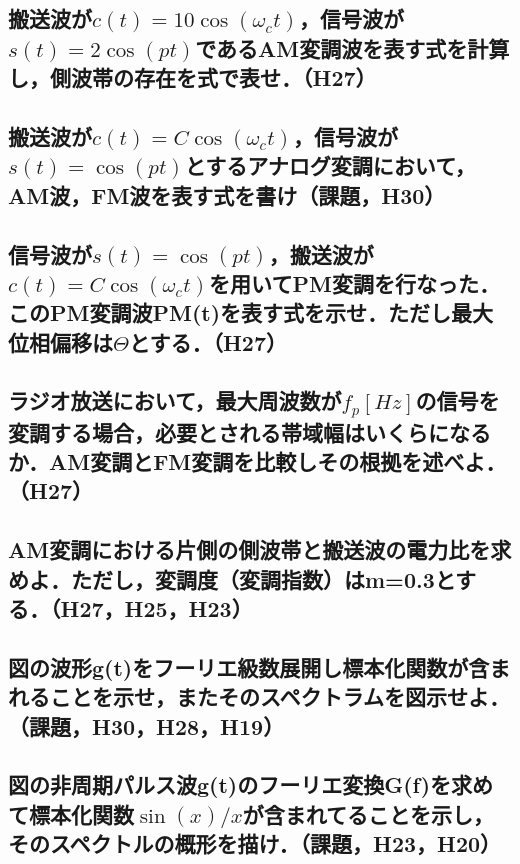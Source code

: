 \newpage
\subsection{搬送波が$c(t) = 10\cos(\omega_c t)$，信号波が$s(t) = 2 \cos(pt)$であるAM変調波を表す式を計算し，側波帯の存在を式で表せ．（H27）}
\vspace{7cm}

\subsection{搬送波が$c(t) = C\cos(\omega_c t)$，信号波が$s(t) = \cos(pt)$とするアナログ変調において，AM波，FM波を表す式を書け（課題，H30）}
\vspace{7cm}

\subsection{信号波が$s(t) = \cos(pt)$，搬送波が$c(t) = C \cos(\omega_c t)$を用いてPM変調を行なった．このPM変調波PM(t)を表す式を示せ．ただし最大位相偏移は$\Theta$とする．（H27）}
\vspace{7cm}

\newpage
\subsection{ラジオ放送において，最大周波数が$f_p[Hz]$の信号を変調する場合，必要とされる帯域幅はいくらになるか．AM変調とFM変調を比較しその根拠を述べよ．（H27）}
\vspace{7cm}

\subsection{AM変調における片側の側波帯と搬送波の電力比を求めよ．ただし，変調度（変調指数）はm=0.3とする．（H27，H25，H23）}
\vspace{7cm}

\newpage
\subsection{図の波形g(t)をフーリエ級数展開し標本化関数が含まれることを示せ，またそのスペクトラムを図示せよ．（課題，H30，H28，H19）}
\vspace{11cm}

\subsection{図の非周期パルス波g(t)のフーリエ変換G(f)を求めて標本化関数$\sin(x) / x$が含まれてることを示し，そのスペクトルの概形を描け．（課題，H23，H20）}
\vspace{11cm}

